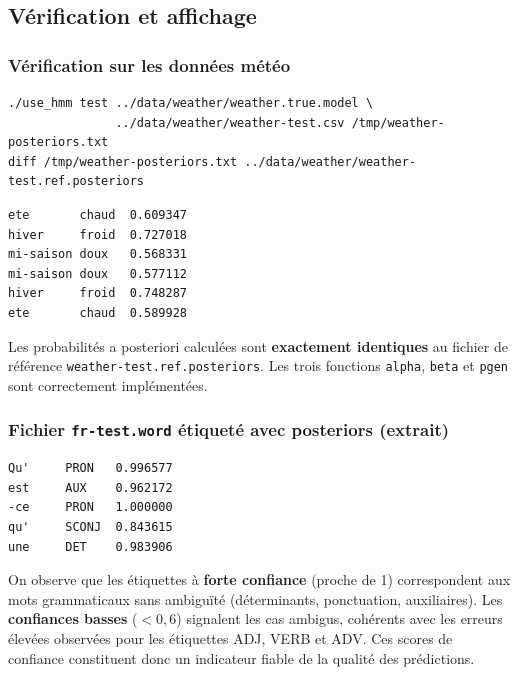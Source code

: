 \documentclass[12pt,a4paper]{article}
\begin{document}
\subsection{Vérification et affichage}

\subsubsection*{Vérification sur les données météo}

\begin{lstlisting}[style=bashstyle]
./use_hmm test ../data/weather/weather.true.model \
               ../data/weather/weather-test.csv /tmp/weather-posteriors.txt
diff /tmp/weather-posteriors.txt ../data/weather/weather-test.ref.posteriors
\end{lstlisting}

\begin{lstlisting}[style=outputstyle]
ete       chaud  0.609347
hiver     froid  0.727018
mi-saison doux   0.568331
mi-saison doux   0.577112
hiver     froid  0.748287
ete       chaud  0.589928
\end{lstlisting}

\begin{resultbox}
Les probabilités a posteriori calculées sont \textbf{exactement identiques} au fichier
de référence \texttt{weather-test.ref.posteriors}. Les trois fonctions
\texttt{alpha}, \texttt{beta} et \texttt{pgen} sont correctement implémentées.
\end{resultbox}

\subsubsection*{Fichier \texttt{fr-test.word} étiqueté avec posteriors (extrait)}

\begin{lstlisting}[style=outputstyle]
Qu'     PRON   0.996577
est     AUX    0.962172
-ce     PRON   1.000000
qu'     SCONJ  0.843615
une     DET    0.983906
\end{lstlisting}

\begin{notebox}
On observe que les étiquettes à \textbf{forte confiance} (proche de 1) correspondent
aux mots grammaticaux sans ambiguïté (déterminants, ponctuation, auxiliaires).
Les \textbf{confiances basses} ($< 0{,}6$) signalent les cas ambigus, cohérents avec
les erreurs élevées observées pour les étiquettes ADJ, VERB et ADV.
Ces scores de confiance constituent donc un indicateur fiable de la qualité des prédictions.
\end{notebox}
\end{document}
